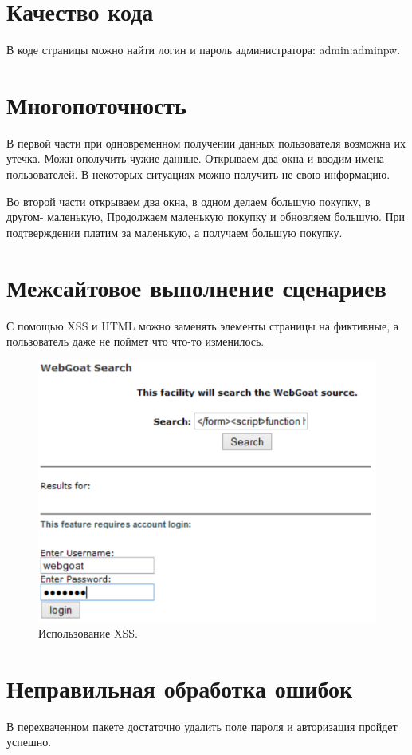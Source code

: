 \documentclass[utf8x, 12pt]{G7-32}
\begin{document}
\section{Качество кода}
В коде страницы можно найти логин и пароль администратора: admin:adminpw.

\section{Многопоточность}
В первой части при одновременном получении данных пользователя возможна их утечка. Можн ополучить чужие данные. Открываем два окна и вводим имена пользователей. В некоторых ситуациях можно получить не свою информацию.

Во второй части открываем два окна, в одном делаем большую покупку, в другом- маленькую, Продолжаем маленькую покупку и обновляем большую. При подтверждении платим за маленькую, а получаем большую покупку.


\section{Межсайтовое выполнение сценариев}
С помощью XSS и HTML можно заменять элементы страницы на фиктивные, а пользователь даже не поймет что что-то изменилось.
\begin{figure}[h!]
\centering
\includegraphics[width=12cm]{rsrc/7_1}
\caption{Использование XSS.}
\end{figure}

\section{Неправильная обработка ошибок}
В перехваченном пакете достаточно удалить поле пароля и авторизация пройдет успешно.
\end{document}
